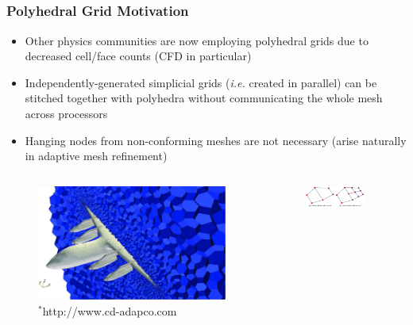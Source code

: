 \documentclass[]{beamer}
\begin{document}
\subsection{}
\begin{frame}[t]\frametitle{Polyhedral Grid Motivation}
         \begin{block}{}{\footnotesize
			\begin{itemize}
				\item Other physics communities are now employing polyhedral grids due to decreased cell/face counts (CFD in particular)
				\item Independently-generated simplicial grids ({\em i.e.} created in parallel) can be stitched together with polyhedra without communicating the whole mesh across processors
				\item Hanging nodes from non-conforming meshes are not necessary (arise naturally in adaptive mesh refinement)
			\end{itemize}}
         \end{block}
	\begin{columns}
		\begin{column}{.5\textwidth}
			\begin{figure}[t]
				\centering
				\includegraphics[width=.60\textwidth]{images/Polymesh_sized.jpg} \\
				{\tiny $^{*}$http://www.cd-adapco.com }
			\end{figure}
		\end{column}
		\begin{column}{.5\textwidth}
			\begin{figure}[t]
				\centering
				\includegraphics[width=0.85\textwidth]{images/local_refinement.png}
			\end{figure}
		\end{column}
	\end{columns}
\end{frame}
\end{document}
